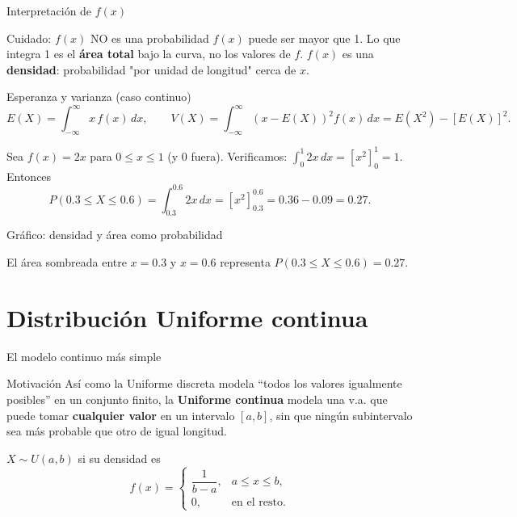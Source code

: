 \documentclass[aspectratio=169,11pt]{beamer}
\begin{document}
\begin{frame}{Interpretación de $f(x)$}
\begin{alertblock}{Cuidado: $f(x)$ NO es una probabilidad}
$f(x)$ puede ser mayor que 1. Lo que integra 1 es el \textbf{área total} bajo la curva, no los valores de $f$. $f(x)$ es una \textbf{densidad}: probabilidad "por unidad de longitud" cerca de $x$.
\end{alertblock}

\begin{block}{Esperanza y varianza (caso continuo)}
$$E(X) = \int_{-\infty}^\infty x\,f(x)\,dx, \qquad V(X) = \int_{-\infty}^\infty (x-E(X))^2 f(x)\,dx = E(X^2)-[E(X)]^2.$$
\end{block}

\begin{example}
Sea $f(x) = 2x$ para $0\le x\le 1$ (y 0 fuera). Verificamos: $\int_0^1 2x\,dx = [x^2]_0^1=1$. Entonces
$$P(0.3\le X\le 0.6) = \int_{0.3}^{0.6}2x\,dx = [x^2]_{0.3}^{0.6} = 0.36-0.09=0.27.$$
\end{example}
\end{frame}

\begin{frame}{Gráfico: densidad y área como probabilidad}
\begin{center}
\end{center}
El área sombreada entre $x=0.3$ y $x=0.6$ representa $P(0.3\le X\le 0.6)=0.27$.
\end{frame}

\section{Distribución Uniforme continua}

\begin{frame}{El modelo continuo más simple}
\begin{block}{Motivación}
Así como la Uniforme discreta modela ``todos los valores igualmente posibles'' en un conjunto finito, la \textbf{Uniforme continua} modela una v.a. que puede tomar \textbf{cualquier valor} en un intervalo $[a,b]$, sin que ningún subintervalo sea más probable que otro de igual longitud.
\end{block}

\begin{definition}
$X\sim U(a,b)$ si su densidad es
$$f(x) = \begin{cases} \dfrac{1}{b-a}, & a\le x\le b, \\[4pt] 0, & \text{en el resto.}\end{cases}$$
\end{definition}
\end{frame}
\end{document}
